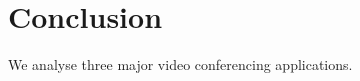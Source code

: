 \section{Conclusion}
\label{sec:conclusion}
We analyse three major video conferencing applications.


